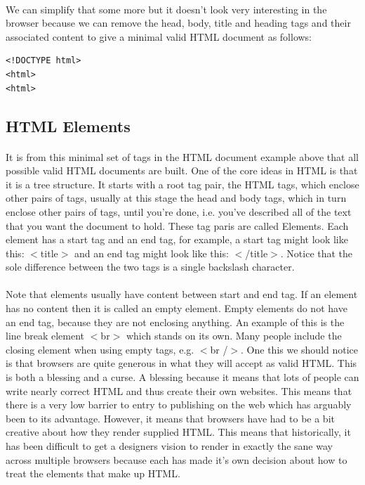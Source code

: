 \documentclass[10pt, a4paper, twosize]{article}
\begin{document}
\paragraph{} We can simplify that some more but it doesn't look very interesting in the browser because we can remove the head, body, title and heading tags and their associated content to give a minimal valid HTML document as follows:

\begin{lstlisting}
<!DOCTYPE html>
<html>
<html>
\end{lstlisting}

\subsection{HTML Elements}
\paragraph{} It is from this minimal set of tags in the HTML document example above that all possible valid HTML documents are built. One of the core ideas in HTML is that it is a tree structure. It starts with a root tag pair, the HTML tags, which enclose other pairs of tags, usually at this stage the head and body tags, which in turn enclose other pairs of tags, until you're done, i.e. you've described all of the text that you want the document to hold. These tag paris are called Elements. Each element has a start tag and an end tag, for example, a start tag might look like this: $<$title$>$ and an end tag might look like this: $<$/title$>$. Notice that the sole difference between the two tags is a single backslash character.

\paragraph{} Note that elements usually have content between start and end tag. If an element has no content then it is called an empty element. Empty elements do not have an end tag, because they are not enclosing anything. An example of this is the line break element $<$br$>$ which stands on its own. Many people include the closing element when using empty tags, e.g. $<$br /$>$. One this we should notice is that browsers are quite generous in what they will accept as valid HTML. This is both a blessing and a curse. A blessing because it means that lots of people can write nearly correct HTML and thus create their own websites. This means that there is a very low barrier to entry to publishing on the web which has arguably been to its advantage. However, it means that browsers have had to be a bit creative about how they render supplied HTML. This means that historically, it has been difficult to get a designers vision to render in exactly the sane way across multiple browsers because each has made it's own decision about how to treat the elements that make up HTML.
\end{document}
